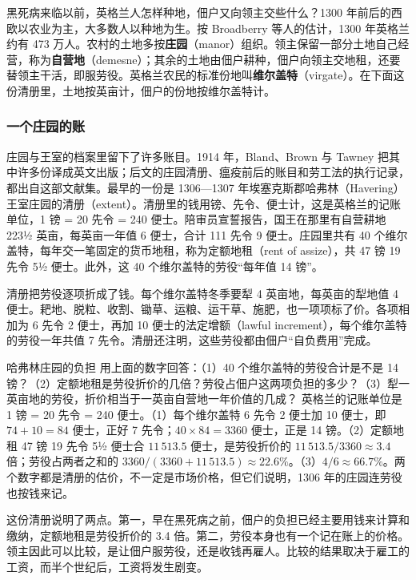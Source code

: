 黑死病来临以前，英格兰人怎样种地，佃户又向领主交些什么？1300 年前后的西欧以农业为主，大多数人以种地为生。按 Broadberry 等人的估计，1300 年英格兰约有 473 万人\cite{broadberry2015}。农村的土地多按\textbf{庄园}（manor）组织。领主保留一部分土地自己经营，称为\textbf{自营地}（demesne）；其余的土地由佃户耕种，佃户向领主交地租，还要替领主干活，即服劳役。英格兰农民的标准份地叫\textbf{维尔盖特}（virgate）。在下面这份清册里，土地按英亩计，佃户的份地按维尔盖特计。

\subsubsection{一个庄园的账}
庄园与王室的档案里留下了许多账目。1914 年，Bland、Brown 与 Tawney 把其中许多份译成英文出版\cite{bbt1914}；后文的庄园清册、瘟疫前后的账目和劳工法的执行记录，都出自这部文献集。最早的一份是 1306—1307 年埃塞克斯郡哈弗林（Havering）王室庄园的清册（extent）。清册里的钱用镑、先令、便士计，这是英格兰的记账单位，1 镑 = 20 先令 = 240 便士。陪审员宣誓报告，国王在那里有自营耕地 223½ 英亩，每英亩一年值 6 便士，合计 111 先令 9 便士。庄园里共有 40 个维尔盖特，每年交一笔固定的货币地租，称为定额地租（rent of assize），共 47 镑 19 先令 5½ 便士。此外，这 40 个维尔盖特的劳役“每年值 14 镑”\cite{bbt1914}。

清册把劳役逐项折成了钱。每个维尔盖特冬季要犁 4 英亩地，每英亩的犁地值 4 便士。耙地、脱粒、收割、锄草、运粮、运干草、施肥，也一项项标了价。各项相加为 6 先令 2 便士，再加 10 便士的法定增额（lawful increment），每个维尔盖特的劳役一年共值 7 先令。清册还注明，这些劳役都由佃户“自负费用”完成\cite{bbt1914}。

\begin{example}{哈弗林庄园的负担}\label{ex:medieval-manor}
用上面的数字回答：（1）40 个维尔盖特的劳役合计是不是 14 镑？（2）定额地租是劳役折价的几倍？劳役占佃户这两项负担的多少？（3）犁一英亩地的劳役，折价相当于一英亩自营地一年价值的几成？
\solution 英格兰的记账单位是 1 镑 = 20 先令 = 240 便士。（1）每个维尔盖特 6 先令 2 便士加 10 便士，即 $74+10=84$ 便士，正好 7 先令；$40\times84=3360$ 便士，正是 14 镑。（2）定额地租 47 镑 19 先令 5½ 便士合 $11\,513.5$ 便士，是劳役折价的 $11\,513.5/3360\approx3.4$ 倍；劳役占两者之和的 $3360/(3360+11\,513.5)\approx22.6\%$。（3）$4/6\approx66.7\%$。两个数字都是清册的估价，不一定是市场价格，但它们说明，1306 年的庄园连劳役也按钱来记。
\end{example}

这份清册说明了两点。第一，早在黑死病之前，佃户的负担已经主要用钱来计算和缴纳，定额地租是劳役折价的 3.4 倍。第二，劳役本身也有一个记在账上的价格。领主因此可以比较，是让佃户服劳役，还是收钱再雇人。比较的结果取决于雇工的工资，而半个世纪后，工资将发生剧变。

